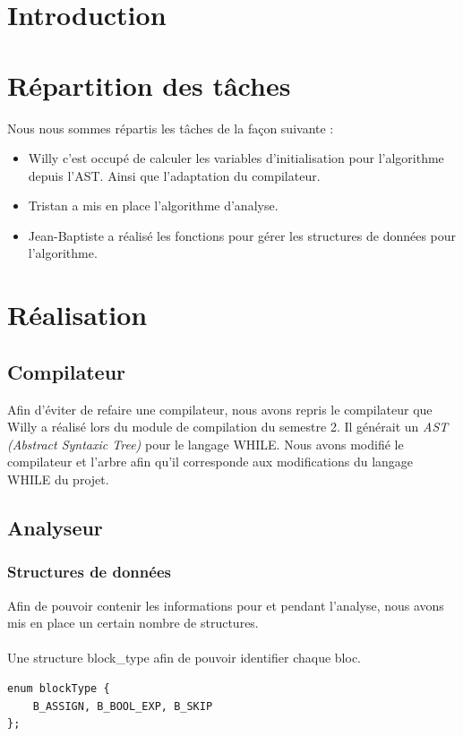 \documentclass[12pt,a4paper,oneside]{article}
\begin{document}
\tableofcontents

\newpage

\section{Introduction}

\section{Répartition des tâches}
Nous nous sommes répartis les tâches de la façon suivante :
\begin{itemize}
\item Willy c'est occupé de calculer les variables d'initialisation pour l'algorithme depuis l'AST. Ainsi que l'adaptation du compilateur.
\item Tristan a mis en place l'algorithme d'analyse.
\item Jean-Baptiste a réalisé les fonctions pour gérer les structures de données pour l'algorithme.
\end{itemize}

\section{Réalisation}
\subsection{Compilateur}
Afin d'éviter de refaire une compilateur, nous avons repris le compilateur que Willy a réalisé lors du module de compilation du semestre 2.
Il générait un \emph{AST (Abstract Syntaxic Tree)} pour le langage WHILE.
Nous avons modifié le compilateur et l'arbre afin qu'il corresponde aux modifications du langage WHILE du projet.

\subsection{Analyseur}

\subsubsection{Structures de données}
Afin de pouvoir contenir les informations pour et pendant l'analyse, nous avons mis en place un certain nombre de structures.

\paragraph{}
Une structure block\_type afin de pouvoir identifier chaque bloc.
\begin{lstlisting}
enum blockType {
	B_ASSIGN, B_BOOL_EXP, B_SKIP
};
\end{lstlisting}
\end{document}
